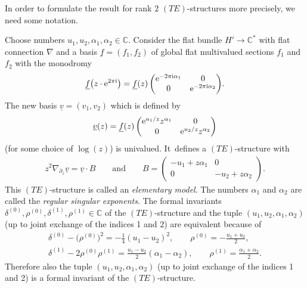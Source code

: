 \documentclass[10pt,a4paper]{amsart}
\numberwithin{equation}{section}
\numberwithin{figure}{section}
\newcommand{\C}{{\mathbb C}}
\newcommand{\uuuu}{\underline}
\newcommand{\paa}{\partial}
\newcommand{\nnn}{\nabla}
\begin{document}
In order to formulate the result for rank $2$ $(TE)$-structures
more precisely, we need some notation.

\begin{Definition}\label{t4.4}
Choose numbers $u_1,u_2,\alpha_1,\alpha_2\in\C$.
Consider the flat bundle $H'\to\C^*$ with flat connection
$\nnn$ and a basis $\uuuu{f}=(f_1,f_2)$
of global flat multivalued sections $f_1$ and $f_2$
with the monodromy
\begin{gather*}%
\uuuu{f}\big(z\cdot {\rm e}^{2\pi {\rm i}}\big)= \uuuu{f}(z)
\begin{pmatrix}{\rm e}^{-2\pi {\rm i} \alpha_1} & 0 \\
0 & {\rm e}^{-2\pi {\rm i} \alpha_2} \end{pmatrix}\!.
\end{gather*}
The new basis $\uuuu{v}=(v_1,v_2)$ which is defined by
\begin{gather*}%
\uuuu{v}(z)= \uuuu{f}(z)
\begin{pmatrix}{\rm e}^{u_1/z}z^{\alpha_1} & 0 \\
0 & {\rm e}^{u_2/z}z^{\alpha_2}\end{pmatrix}
\end{gather*}
(for some choice of $\log(z)$) is univalued. It~defines a $(TE)$-structure with
\begin{gather*}%
z^2\nnn_{\paa_z}\uuuu{v}=\uuuu{v}\cdot B
\qquad\text{and}\qquad
B=\begin{pmatrix}-u_1+ z\alpha_1 & 0 \\
0 & -u_2+z\alpha_2\end{pmatrix}\!.
\end{gather*}
This $(TE)$-structure is called an {\it elementary model}.
The numbers $\alpha_1$ and $\alpha_2$ are called
the {\it regular singular exponents}.
The formal invariants
$\delta^{(0)},\rho^{(0)},\delta^{(1)},\rho^{(1)}\in\C$
of the $(TE)$-structure and the tuple
$(u_1,u_2,\alpha_1,\alpha_2)$ (up to joint exchange of the indices 1 and 2) are equivalent because of
\begin{gather}\label{4.6}
\delta^{(0)}-\big(\rho^{(0)}\big)^2= -\frac{1}{4}(u_1-u_2)^2,\qquad
\rho^{(0)}=-\frac{u_1+u_2}{2},
\\
\delta^{(1)}-2\rho^{(0)}\rho^{(1)}=\frac{u_1-u_2}{2}(\alpha_1-\alpha_2),\qquad
\rho^{(1)}=\frac{\alpha_1+\alpha_2}{2}.\label{4.7}
\end{gather}
Therefore also the tuple $(u_1,u_2,\alpha_1,\alpha_2)$
(up to joint exchange of the indices 1 and 2)
is a formal invariant of the $(TE)$-structure.
\end{Definition}
\end{document}
